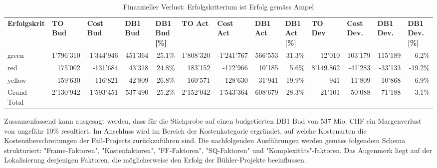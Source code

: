 \begin{table}[htbp]
	\centering
	\caption{Finanzieller Verlust: Erfolgskriterium ist Erfolg gemäss Ampel}
	\begin{tabular}{lrrrrrrrrrrrr}
		\textbf{Erfolgskrit} & \multicolumn{1}{l}{\textbf{TO Bud}} & \multicolumn{1}{l}{\textbf{Cost Bud}} & \multicolumn{1}{l}{\textbf{DB1 Bud}} & \multicolumn{1}{l}{\textbf{DB1 Bud [\%]}} & \multicolumn{1}{l}{\textbf{TO Act}} & \multicolumn{1}{l}{\textbf{Cost Act}} & \multicolumn{1}{l}{\textbf{DB1 Act}} & \multicolumn{1}{l}{\textbf{DB1 Act [\%]}} & \multicolumn{1}{l}{\textbf{TO Dev}} & \multicolumn{1}{l}{\textbf{Cost Dev.}} & \multicolumn{1}{l}{\textbf{DB1 Dev.}} & \multicolumn{1}{l}{\textbf{DB1 Dev. [\%]}} \\
		green & 1'796'310 & -1'344'946 & 451'364 & 25.1\% & 1'808'320 & -1'241'767 & 566'553 & 31.3\% & 12'010 & 103'179 & 115'189 & 6.2\% \\
		red   & 175'002 & -131'684 & 43'318 & 24.8\% & 183'152 & -172'966 & 10'185 & 5.6\% & 8'149.862 & -41'283 & -33'133 & -19.2\% \\
		yellow & 159'630 & -116'821 & 42'809 & 26.8\% & 160'571 & -128'630 & 31'941 & 19.9\% & 941   & -11'809 & -10'868 & -6.9\% \\
		Grand Total & 2'130'942 & -1'593'451 & 537'490 & 25.2\% & 2'152'042 & -1'543'364 & 608'679 & 28.3\% & 21'101 & 50'088 & 71'188 & 3.1\% \\
	\end{tabular}%
	\label{tab:addlabel}%
\end{table}%
\newline\newline
Zussamenfassend kann ausgesagt werden, dass für die Stichprobe auf einen budgetierten DB1 Bud von 537 Mio. CHF ein Margenverlust von ungefähr 10\% resultiert. Im Anschluss wird im Bereich der Kostenkategorie ergründet, auf welche Kostenarten die Kostenüberschreitungen der Fail-Projects zurückzuführen sind. Die nachfolgenden Ausführungen werden gemäss folgendem Schema strukturiert: "Frame-Faktoren", "Kostenfaktoren", "FF-Faktoren", "SQ-Faktoren" und  "Komplexitäts"-faktoren. Das Augenmerk liegt auf der Lokalisierung derjenigen Faktoren, die möglicherweise den Erfolg der Bühler-Projekte beeinflussen.
